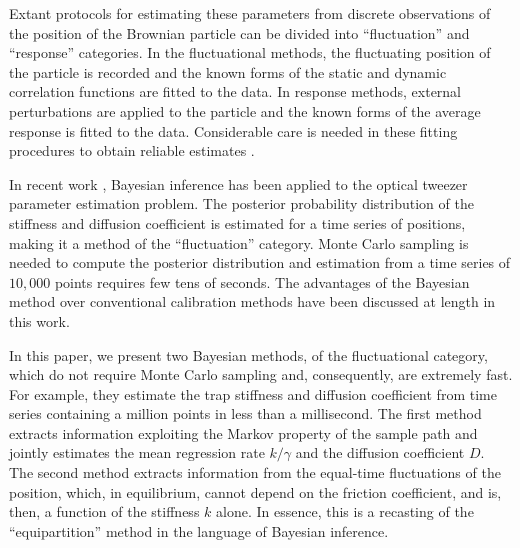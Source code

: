 \documentclass[english,aps, twocolumn, pre,superscriptaddress]{revtex4-1}
\begin{document}
Extant protocols for estimating these parameters from discrete observations
of the position of the Brownian particle can be divided into ``fluctuation''
and ``response'' categories. In the fluctuational methods, the fluctuating
position of the particle is recorded and the known forms of the static
and dynamic correlation functions are fitted to the data. In response
methods, external perturbations are applied to the particle and the
known forms of the average response is fitted to the data. Considerable
care is needed in these fitting procedures to obtain reliable estimates
\cite{berg2004power}. 

In recent work \cite{richly2013calibrating}, Bayesian inference has
been applied to the optical tweezer parameter estimation problem.
The posterior probability distribution of the stiffness and diffusion
coefficient is estimated for a time series of positions, making it
a method of the ``fluctuation'' category. Monte Carlo sampling is
needed to compute the posterior distribution and estimation from a
time series of $10,000$ points requires few tens of seconds. The
advantages of the Bayesian method over conventional calibration methods
have been discussed at length in this work.

In this paper, we present two Bayesian methods, of the fluctuational
category, which do not require Monte Carlo sampling and, consequently,
are extremely fast. For example, they estimate the trap stiffness
and diffusion coefficient from time series containing a million points
in less than a millisecond. The first method extracts information
exploiting the Markov property of the sample path and jointly estimates
the mean regression rate $k/\gamma$ and the diffusion coefficient
$D$. The second method extracts information from the equal-time fluctuations
of the position, which, in equilibrium, cannot depend on the friction
coefficient, and is, then, a function of the stiffness $k$ alone.
In essence, this is a recasting of the ``equipartition'' method
in the language of Bayesian inference.
\end{document}
